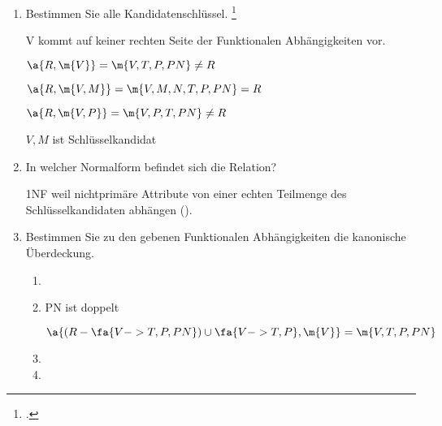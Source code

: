\documentclass{lehramt-informatik-aufgabe}
\begin{document}
\begin{enumerate}

%

\item Bestimmen Sie alle Kandidatenschlüssel.
\footcite{db:pdf:tum:uebung-08}

\begin{liAntwort}
V kommt auf keiner rechten Seite der Funktionalen Abhängigkeiten vor.

$\a{R, \m{V}} = \m{V, T, P, PN} \neq  R$

$\a{R, \m{V, M}} = \m{V, M, N, T, P, PN} = R$

$\a{R, \m{V, P}} = \m{V, P, T, PN} \neq R$

$V, M$ ist Schlüsselkandidat
\end{liAntwort}

%

\item In welcher Normalform befindet sich die Relation?

\begin{liAntwort}
1NF weil nichtprimäre Attribute von einer echten Teilmenge des
Schlüsselkandidaten abhängen (\zB {}).
\end{liAntwort}

%

\item Bestimmen Sie zu den gebenen Funktionalen Abhängigkeiten die
kanonische Überdeckung.

\begin{liAntwort}

\begin{enumerate}
\item {}

\liNichtsZuTun

\item {}

PN ist doppelt

$\a{(R - \fa{V -> T, P, PN}) \cup \fa{V -> T, P}, \m{V}} = \m{V, T, P, PN}$


\item {}

\liNichtsZuTun

\item {}


\end{enumerate}
\end{liAntwort}


\end{enumerate}
\end{document}
